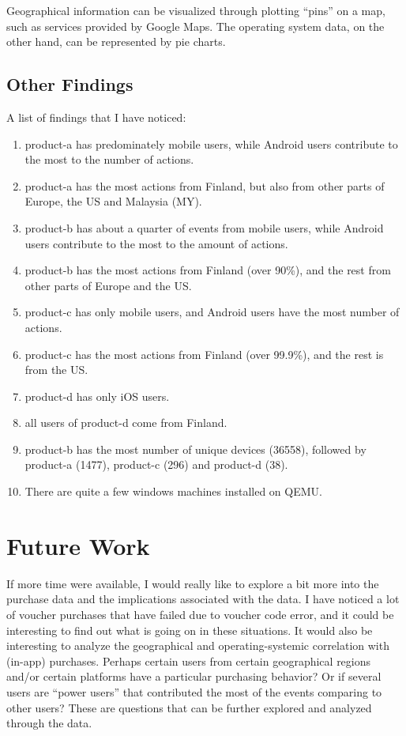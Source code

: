 \documentclass[12pt,letter]{article}
\newcommand{\be}{\begin{enumerate}}
\newcommand{\ee}{\end{enumerate}}
\begin{document}
  Geographical information can be visualized through plotting ``pins'' on a map,
  such as services provided by Google Maps. The operating system data, on the
  other hand, can be represented by pie charts.

  \subsection{Other Findings}
  A list of findings that I have noticed:
  \be
  \item product-a has predominately mobile users, while Android users contribute
      to the most to the number of actions.
  \item product-a has the most actions from Finland, but also from other parts
      of Europe, the US and Malaysia (MY).
  \item product-b has about a quarter of events from mobile users, while Android
      users contribute to the most to the amount of actions.
  \item product-b has the most actions from Finland (over 90\%), and the rest
      from other parts of Europe and the US.
  \item product-c has only mobile users, and Android
      users have the most number of actions.
  \item product-c has the most actions from Finland (over 99.9\%), and the rest
      is from the US.
  \item product-d has only iOS users.
  \item all users of product-d come from Finland.
  \item product-b has the most number of unique devices (36558), followed by product-a
      (1477), product-c (296) and product-d (38).
  \item There are quite a few windows machines installed on QEMU.
  \ee

  \section{Future Work}
  If more time were available, I would really like to explore a bit more into
  the purchase data and the implications associated with the data. I have
  noticed a lot of voucher purchases that have failed due to voucher code error,
  and it could be interesting to find out what is going on in these situations.
  It would also be interesting to analyze the geographical and
  operating-systemic correlation with (in-app) purchases. Perhaps certain users
  from certain geographical regions and/or certain platforms have a particular
  purchasing behavior? Or if several users are ``power users'' that contributed
  the most of the events comparing to other users? These are questions that can
  be further explored and analyzed through the data.
\end{document}
